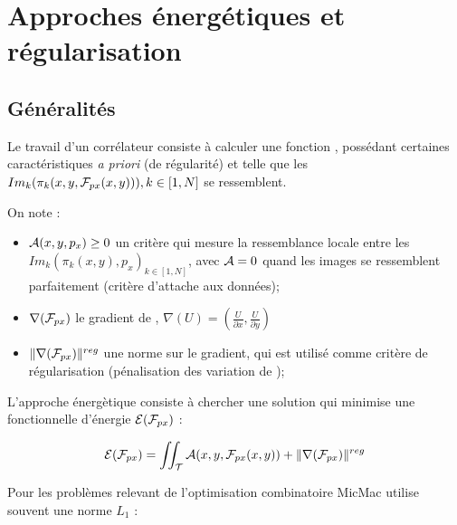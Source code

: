 \chapter{Approches \'energ\'etiques et r\'egularisation}


\section{G\'en\'eralit\'es}

\label{DUMG:Appr:Energ}

Le travail d'un corr\'elateur consiste \`a calculer une fonction 
\FPx , poss\'edant certaines caract\'eristiques \emph{a priori}
(de r\'egularit\'e)  et
telle que les $Im_k(\pi_k(x,y,\FPx(x,y))),k\in [1,N]$ se ressemblent.

On note :

\begin{itemize}
     \item $\Ress(x,y,p_x) \geq 0$  un crit\`ere qui mesure la 
            ressemblance locale  entre les 
            $Im_k(\pi_k(x,y),p_x)_{k\in [1,N]}$, avec $\Ress=0$
            quand les images se ressemblent parfaitement (crit\`ere 
            d'attache aux donn\'ees);

      \item $\nabla(\FPx)$ le gradient de \FPx, 
             $\nabla(U) = (\frac{U}{\partial x}, \frac{U}{\partial y})$

      \item $\| \nabla(\FPx) \|^{reg}$ une norme sur le gradient, qui
            est utilis\'e comme crit\`ere de r\'egularisation (p\'enalisation
            des variation de \FPx);
\end{itemize}

L'approche \'energ\`etique consiste \`a chercher 
une solution \FPx qui minimise une fonctionnelle d'\'energie $\Energ(\FPx)$  :

\begin{equation}
   \Energ(\FPx) = \iint_\ETer \Ress(x,y,\FPx(x,y)) + \| \nabla(\FPx) \|^{reg}
\end{equation}

Pour les probl\`emes relevant de l'optimisation combinatoire
MicMac utilise souvent une norme $L_1$ :

